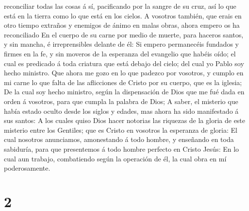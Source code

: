 reconciliar todas las cosas á sí, pacificando por la sangre de su cruz,
así lo que está en la tierra como lo que está en los cielos.
 A vosotros también, que erais en otro tiempo extraños y
enemigos de ánimo en malas obras, ahora empero os ha reconciliado
 En el cuerpo de su carne por medio de muerte, para haceros
santos, y sin mancha, é irreprensibles delante de él:  Si
empero permanecéis fundados y firmes en la fe, y sin moveros de la
esperanza del evangelio que habéis oído; el cual es predicado á toda
criatura que está debajo del cielo; del cual yo Pablo soy hecho
ministro.  Que ahora me gozo en lo que padezco por
vosotros, y cumplo en mi carne lo que falta de las aflicciones de Cristo
por su cuerpo, que es la iglesia;  De la cual soy hecho
ministro, según la dispensación de Dios que me fué dada en orden á
vosotros, para que cumpla la palabra de Dios;  A saber, el
misterio que había estado oculto desde los siglos y edades, mas ahora ha
sido manifestado á sus santos:  A los cuales quiso Dios
hacer notorias las riquezas de la gloria de este misterio entre los
Gentiles; que es Cristo en vosotros la esperanza de gloria:
 El cual nosotros anunciamos, amonestando á todo hombre, y
enseñando en toda sabiduría, para que presentemos á todo hombre perfecto
en Cristo Jesús:  En lo cual aun trabajo, combatiendo según
la operación de él, la cual obra en mí poderosamente.

\hypertarget{section-1}{%
\section{2}\label{section-1}}

